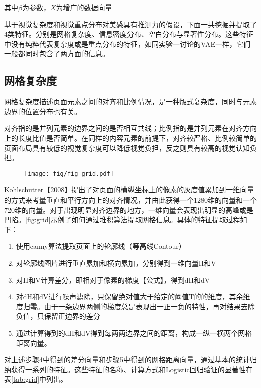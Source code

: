 其中$\beta$为参数，$X$为增广的数据向量

基于视觉复杂度和视觉重点分布对美感具有推测力的假设，下面一共挖掘并提取了4类特征。分别是网格复杂度、信息密度分布、空白分布与显著性分布。这些特征中没有纯粹代表复杂度或是重点分布的特征，如同实验一讨论的VAE一样，它们一般都同时包含了两方面的信息。

\subsection{网格复杂度}
网格复杂度描述页面元素之间的对齐和比例情况，是一种版式复杂度，同时与元素边界的位置分布也有关。

对齐指的是并列元素的边界之间的是否相互共线；比例指的是并列元素在对齐方向上的长度比值是否简单。在同样的内容元素的前提下，对齐较严格、比例较简单的页面布局具有较低的视觉复杂度可以降低视觉负担，反之则具有较高的视觉认知负担。

\begin{figure}
  \texttt{[image: fig/fig\_grid.pdf]}
\end{figure}

Kohlschutter【2008】提出了对页面的横纵坐标上的像素的灰度值累加到一维向量的方式来考量垂直和平行方向上的对齐情况，并由此获得一个1280维的向量和一个720维的向量。对于出现明显对齐边界的地方，一维向量会表现出明显的高峰或是凹陷。\ref{fig:grid}示例了如何通过堆积算法提取网格信息。具体的特征提取过程如下：

\begin{enumerate}
  \item 使用canny算法提取页面上的轮廓线（等高线Contour）
  \item 对轮廓线图片进行垂直累加和横向累加，分别得到一维向量H和V
  \item 对H和V计算差分，即相对于像素的梯度【公式】，得到dH和dV
  \item 对dH和dV进行噪声滤除，只保留绝对值大于给定的阈值T的的维度，其余维度归零。由于一条边界两侧的梯度总是表现出一正一负的特性，再对结果去除负值，只保留正边界的差分
  \item 通过计算得到的dH和dV得到每两两边界之间的距离，构成一纵一横两个网格距离向量。
\end{enumerate}

对上述步骤4中得到的差分向量和步骤5中得到的网格距离向量，通过基本的统计归纳获得一系列的特征。这些特征的名称、计算方式和Logistic回归验证的显著性在表\ref{tab:grid}中列出。

